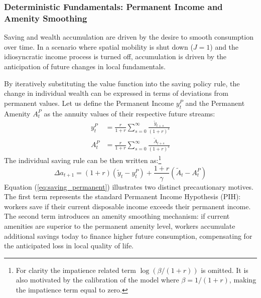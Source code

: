 \documentclass[12pt, a4paper]{article}
\begin{document}
\subsubsection*{Deterministic Fundamentals: Permanent Income and Amenity Smoothing}
Saving and wealth accumulation are driven by the desire to smooth consumption over time. In a scenario where spatial mobility is shut down ($J=1$) and the idiosyncratic income process is turned off, accumulation is driven by the anticipation of future changes in local fundamentals.  

By iteratively substituting the value function into the saving policy rule, the change in individual wealth can be expressed in terms of deviations from permanent values. Let us define the Permanent Income $y_t^P$ and the Permanent Amenity $A_t^P$ as the annuity values of their respective future streams:
\begin{align}
    y_t^P &= \frac{r}{1+r} \sum_{s=0}^{\infty} \frac{\tilde{y}_{t+s}}{(1+r)^s} \label{eq:perm_income} \\
    A_t^P &= \frac{r}{1+r} \sum_{s=0}^{\infty} \frac{\tilde{A}_{t+s}}{(1+r)^s} \label{eq:perm_amenity}
\end{align}
The individual saving rule can be then written as:\footnote{For clarity the impatience related term $\log(\beta/(1+r))$ is omitted. It is also motivated by the calibration of the model where $\beta = 1/(1+r)$, making the impatience term equal to zero.}
\begin{equation}
    \Delta a_{t+1} = (1+r) \left( \tilde{y}_t - y_t^P \right) + \frac{1+r}{\gamma} \left( \tilde{A}_t - A_t^P \right)
    \label{eq:saving_permanent}
\end{equation}
Equation (\ref{eq:saving_permanent}) illustrates two distinct precautionary motives. The first term represents the standard Permanent Income Hypothesis (PIH): workers save if their current disposable income exceeds their permanent income. The second term introduces an amenity smoothing mechanism: if current amenities are superior to the permanent amenity level, workers accumulate additional savings today to finance higher future consumption, compensating for the anticipated loss in local quality of life. 
\end{document}

